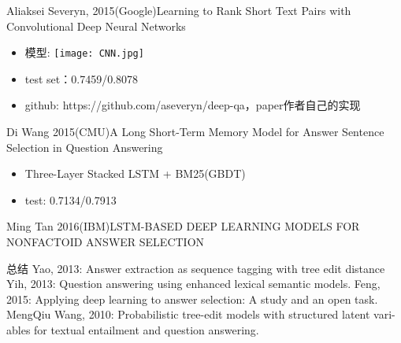 \documentclass{beamer}
\begin{document}
\begin{frame}{Aliaksei Severyn, 2015(Google)}{Learning to Rank Short Text Pairs with Convolutional Deep Neural Networks}
\begin{itemize}
\item 模型:
\texttt{[image: CNN.jpg]}
\item test set：0.7459/0.8078
\item github: https://github.com/aseveryn/deep-qa，paper作者自己的实现
\end{itemize}
\end{frame}
\begin{frame}{Di Wang 2015(CMU)}{A Long Short-Term Memory Model for Answer Sentence Selection in Question Answering}
\begin{itemize}
\item Three-Layer Stacked LSTM + BM25(GBDT)
\item test: 0.7134/0.7913    
\end{itemize}
\end{frame}
\begin{frame}{Ming Tan 2016(IBM)}{LSTM-BASED DEEP LEARNING MODELS FOR NONFACTOID ANSWER SELECTION}
\end{frame}
\begin{frame}{总结}
Yao, 2013: Answer extraction as sequence tagging with tree edit distance
Yih, 2013: Question answering using enhanced lexical semantic models.
Feng, 2015: Applying deep learning to answer selection: A study and an open task.
MengQiu Wang, 2010: Probabilistic tree-edit models with structured latent vari- ables for textual entailment and question answering.
\end{frame}
\end{document}
